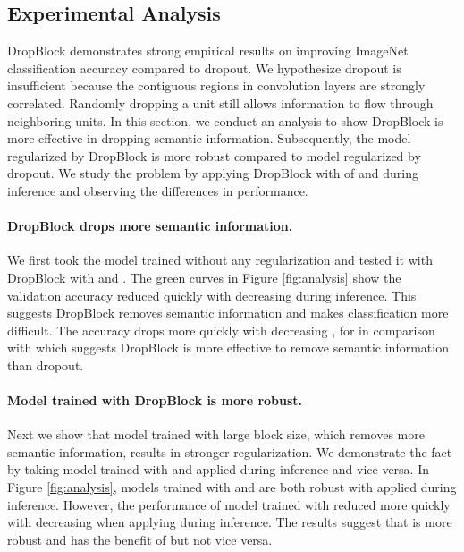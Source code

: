 \documentclass{article}
\begin{document}
\subsection{Experimental Analysis}
DropBlock demonstrates strong empirical results on improving ImageNet classification accuracy compared to dropout. We hypothesize dropout is insufficient because the contiguous regions in convolution layers are strongly correlated. Randomly dropping a unit still allows information to flow through neighboring units. In this section, we conduct an analysis to show DropBlock is more effective in dropping semantic information. Subsequently, the model regularized by DropBlock is more robust compared to model regularized by dropout. We study the problem by applying DropBlock with  of  and  during inference and observing the differences in performance.

\paragraph{DropBlock drops more semantic information.}
We first took the model trained without any regularization and tested it with DropBlock with  and . The green curves in Figure \ref{fig:analysis} show the validation accuracy reduced quickly with decreasing  during inference. This suggests DropBlock removes semantic information and makes classification more difficult.
The accuracy drops more quickly with decreasing , for  in comparison with  which suggests DropBlock is more effective to remove semantic information than dropout.

\paragraph{Model trained with DropBlock is more robust.}
Next we show that model trained with large block size, which removes more semantic information, results in stronger regularization. We demonstrate the fact by taking model trained with  and applied  during inference and vice versa. In Figure \ref{fig:analysis}, models trained with  and  are both robust with  applied during inference. However, the performance of model trained with  reduced more quickly with decreasing  when applying  during inference. The results suggest that  is more robust and has the benefit of  but not vice versa.
\end{document}
